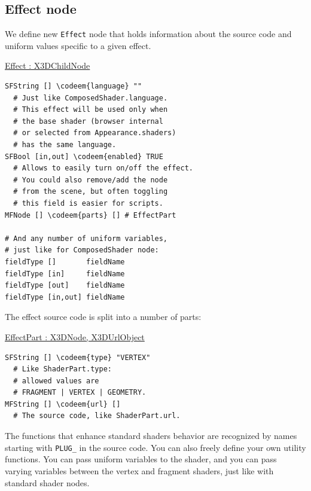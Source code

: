 \documentclass{acmsiggraph}                     %
\newenvironment{mycode}
{\begin{mycodecore}}
{\end{mycodecore}
\vspace{-0.1in}}
\newcommand*{\codeem}[1]{\textbf{#1}}
\begin{document}
\subsection{Effect node}

We define new \texttt{Effect} node that holds information about
the source code and uniform values specific to a given effect.

\begin{mycode}
\underline{Effect : X3DChildNode}
\begin{Verbatim}[commandchars=\\\{\}]
SFString [] \codeem{language} ""
  # Just like ComposedShader.language.
  # This effect will be used only when
  # the base shader (browser internal
  # or selected from Appearance.shaders)
  # has the same language.
SFBool [in,out] \codeem{enabled} TRUE
  # Allows to easily turn on/off the effect.
  # You could also remove/add the node
  # from the scene, but often toggling
  # this field is easier for scripts.
MFNode [] \codeem{parts} [] # EffectPart

# And any number of uniform variables,
# just like for ComposedShader node:
fieldType []       fieldName
fieldType [in]     fieldName
fieldType [out]    fieldName
fieldType [in,out] fieldName
\end{Verbatim}
\end{mycode}

\needspace{1in}
The effect source code is split into a number of parts:

\begin{mycode}
\underline{EffectPart : X3DNode, X3DUrlObject}
\begin{Verbatim}[commandchars=\\\{\}]
SFString [] \codeem{type} "VERTEX"
  # Like ShaderPart.type:
  # allowed values are
  # FRAGMENT | VERTEX | GEOMETRY.
MFString [] \codeem{url} []
  # The source code, like ShaderPart.url.
\end{Verbatim}
\end{mycode}


The functions that enhance standard shaders behavior are recognized
by names starting with \texttt{PLUG\_} in the source code.
You can also freely define your own utility functions.
You can pass uniform variables to the shader,
and you can pass varying variables between the vertex and fragment
shaders, just like with standard shader nodes.
\end{document}
